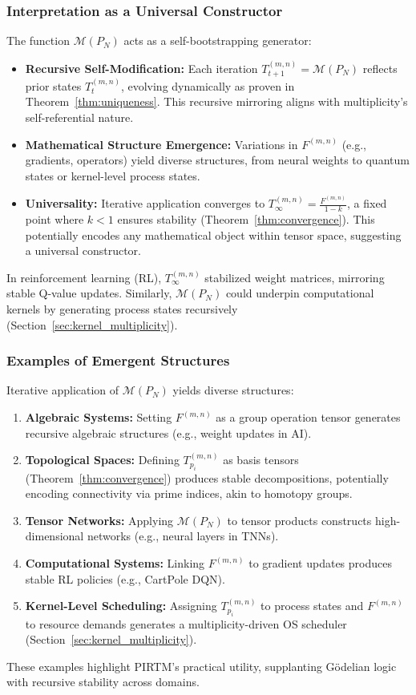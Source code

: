 \documentclass[12pt]{article}
\begin{document}
\subsubsection{Interpretation as a Universal Constructor}
The function \(\mathcal{M}(P_N)\) acts as a self-bootstrapping generator:
\begin{itemize}
    \item \textbf{Recursive Self-Modification:} Each iteration \(T_{t+1}^{(m,n)} = \mathcal{M}(P_N)\) reflects prior states \(T_t^{(m,n)}\), evolving dynamically as proven in Theorem~\ref{thm:uniqueness}. This recursive mirroring aligns with multiplicity’s self-referential nature.
    \item \textbf{Mathematical Structure Emergence:} Variations in \(F^{(m,n)}\) (e.g., gradients, operators) yield diverse structures, from neural weights to quantum states or kernel-level process states.
    \item \textbf{Universality:} Iterative application converges to \(T_\infty^{(m,n)} = \frac{F^{(m,n)}}{1 - k}\), a fixed point where \(k < 1\) ensures stability (Theorem~\ref{thm:convergence}). This potentially encodes any mathematical object within tensor space, suggesting a universal constructor.
\end{itemize}
In reinforcement learning (RL), \(T_\infty^{(m,n)}\) stabilized weight matrices, mirroring stable Q-value updates. Similarly, \(\mathcal{M}(P_N)\) could underpin computational kernels by generating process states recursively (Section~\ref{sec:kernel_multiplicity}).

\subsubsection{Examples of Emergent Structures}
Iterative application of \(\mathcal{M}(P_N)\) yields diverse structures:
\begin{enumerate}
    \item \textbf{Algebraic Systems:} Setting \(F^{(m,n)}\) as a group operation tensor generates recursive algebraic structures (e.g., weight updates in AI).
    \item \textbf{Topological Spaces:} Defining \(T_{p_i}^{(m,n)}\) as basis tensors (Theorem~\ref{thm:convergence}) produces stable decompositions, potentially encoding connectivity via prime indices, akin to homotopy groups.
    \item \textbf{Tensor Networks:} Applying \(\mathcal{M}(P_N)\) to tensor products constructs high-dimensional networks (e.g., neural layers in TNNs).
    \item \textbf{Computational Systems:} Linking \(F^{(m,n)}\) to gradient updates produces stable RL policies (e.g., CartPole DQN).
    \item \textbf{Kernel-Level Scheduling:} Assigning \(T_{p_i}^{(m,n)}\) to process states and \(F^{(m,n)}\) to resource demands generates a multiplicity-driven OS scheduler (Section~\ref{sec:kernel_multiplicity}).
\end{enumerate}
These examples highlight PIRTM’s practical utility, supplanting Gödelian logic with recursive stability across domains.
\end{document}
